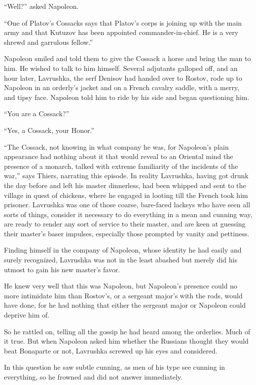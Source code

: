 ``Well?'' asked Napoleon.

``One of Platov's Cossacks says that Platov's corps is joining up
with the main army and that Kutuzov has been appointed
commander-in-chief. He is a very shrewd and garrulous fellow.''

Napoleon smiled and told them to give the Cossack a horse and
bring the man to him. He wished to talk to him himself. Several
adjutants galloped off, and an hour later, Lavrushka, the serf
Denisov had handed over to Rostov, rode up to Napoleon in an
orderly's jacket and on a French cavalry saddle, with a merry,
and tipsy face. Napoleon told him to ride by his side and began
questioning him.

``You are a Cossack?''

``Yes, a Cossack, your Honor.''

``The Cossack, not knowing in what company he was, for Napoleon's
plain appearance had nothing about it that would reveal to an
Oriental mind the presence of a monarch, talked with extreme
familiarity of the incidents of the war,'' says Thiers, narrating
this episode. In reality Lavrushka, having got drunk the day
before and left his master dinnerless, had been whipped and sent
to the village in quest of chickens, where he engaged in looting
till the French took him prisoner.  Lavrushka was one of those
coarse, bare-faced lackeys who have seen all sorts of things,
consider it necessary to do everything in a mean and cunning way,
are ready to render any sort of service to their master, and are
keen at guessing their master's baser impulses, especially those
prompted by vanity and pettiness.

Finding himself in the company of Napoleon, whose identity he had
easily and surely recognized, Lavrushka was not in the least
abashed but merely did his utmost to gain his new master's favor.

He knew very well that this was Napoleon, but Napoleon's presence
could no more intimidate him than Rostov's, or a sergeant major's
with the rods, would have done, for he had nothing that either
the sergeant major or Napoleon could deprive him of.

So he rattled on, telling all the gossip he had heard among the
orderlies. Much of it true. But when Napoleon asked him whether
the Russians thought they would beat Bonaparte or not, Lavrushka
screwed up his eyes and considered.

In this question he saw subtle cunning, as men of his type see
cunning in everything, so he frowned and did not answer
immediately.

